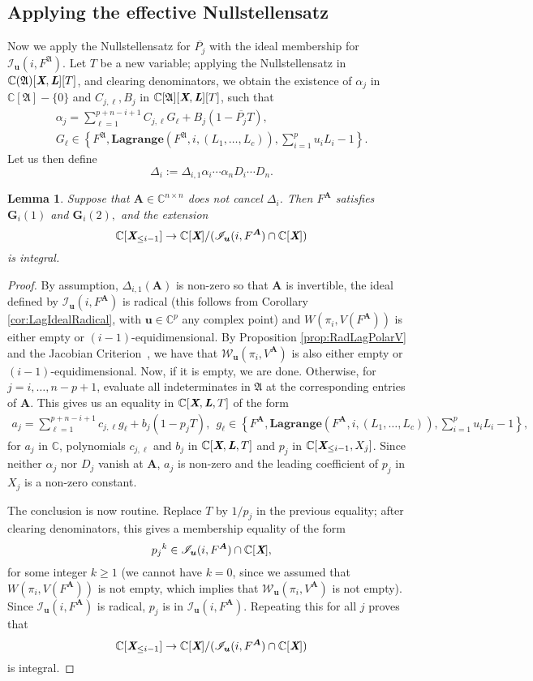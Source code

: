 \documentclass[a4paper]{article}
\def\A{\mathfrak{A}}
\def\Lb{\textit{\textbf{L}}}
\def\Xb{\textit{\textbf{X}}}
\def\mA{{\bm A}}
\def\ub{{\bm u}}
\def\pjb{\overline{P_{j}}}
\def\D{\Delta}
\def\C{\mathbb{C}}
\def\WiA{W(\pi_i,V(F^{\mA}))}
\def\lagFA{{\bm{Lagrange}}(F^{\mA},i,(L_1,\hdots,L_c))}
\def\lagFfA{{\bm{Lagrange}}(F^{\A},i,(L_1,\hdots,L_c))}
\def\IilA{\mathscr{I}_{\ub}(i,F^{\mA})}
\def\IilfA{\mathscr{I}_{\ub}(i,F^{\A})}
\def\WilA{\mathscr{W}_{\ub}(\pi_i,V^{\mA})}
\def\udl{\sum_{i=1}^pu_iL_i}
\newtheorem{lemma}[theorem]{Lemma}
\begin{document}
\subsection{Applying the effective Nullstellensatz}
Now we apply the Nullstellensatz for $\pjb$ with the ideal membership for $\IilfA.$ Let $T$ be a new variable; applying the
Nullstellensatz in $\C(\A)[\Xb,\Lb][T]$, and clearing
denominators, we obtain the existence of $\alpha_j$ in
$\C[\A]-\{0\}$ and $ C_{j,\ell},B_j$ in
$\C[\A][\Xb,\Lb][T]$, such that
\begin{align*}
\alpha_j = \sum_{\ell=1}^{p+n-i+1} C_{j,\ell} G_\ell + B_j (1-\pjb T),\\  G_\ell \in 
\left\{ 
F^\A,\lagFfA, \udl-1
\right\}.
\end{align*}
Let us then define 
$$\D_{i}:=\D_{i,1} \alpha_i \cdots \alpha_n D_i \cdots D_n.$$

\begin{lemma}\label{lem:6.4}
Suppose that $\mA \in \C^{n\times n}$ does not cancel $\D_{i}$. Then $F^{\mA}$ satisfies $\bm G_i(1)$ and $\bm G_i(2),$ and the extension
\[
 \C[\Xb_{\leq i-1}]\rightarrow \C[\Xb]/(\IilA \cap \C[\Xb])
\]
is integral.
\end{lemma}

\begin{proof}
By assumption, $\D_{i,1}(\mA)$ is non-zero so that $\mA$ is
invertible, the
ideal defined by $\IilA$ is radical (this follows from Corollary \ref{cor:LagIdealRadical}, with $\ub \in \C^p$ any complex point) and 
$\WiA$ is either empty or $(i-1)$-equidimensional. By Proposition \ref{prop:RadLagPolarV} and the Jacobian Criterion~\cite[Corollary 16.20]{ECA}, we have that $\WilA$ is also either empty or $(i-1)$-equidimensional. Now, if
it is empty, we are done. Otherwise, for $j=i,\dots,n-p+1$, evaluate all indeterminates in $\A$ at the
corresponding entries of $\mA$. This gives us
an equality in $\C[\Xb,\Lb,T]$ of the form
\begin{align*}
a_j = \sum_{\ell=1}^{p+n-i+1} c_{j,\ell} g_\ell + b_j (1-p_j T),\ \  g_\ell \in 
\left\{ 
F^{\mA}, \lagFA, \udl-1
\right\},
\end{align*}
for $a_j$ in $\C$, polynomials $c_{j,\ell}$ and $b_j$ in
$\C[\Xb,\Lb,T]$ and $p_j$ in
$\C[\Xb_{\leq i-1},X_j]$. Since neither $\alpha_j$ nor $D_j$
vanish at $\mA$, $a_j$ is non-zero and the leading coefficient of
$p_j$ in $X_j$ is a non-zero constant.

The conclusion is now routine. Replace $T$ by $1/p_j$ in the
previous equality; after clearing denominators, this gives a
membership equality of the form 
\[
p_j{}^k \in \IilA \cap \C[\Xb],
\]
for some integer $k \ge 1$ (we cannot have $k=0$, since we assumed that $\WiA$ is not empty, which implies that $\WilA$ is not empty). Since $\IilA$ is radical,
$p_j$ is in $\IilA$. Repeating this for all $j$ proves that 
\[
\C[\Xb_{\leq i-1}]\rightarrow\C[\Xb]/(\IilA \cap \C[\Xb])
\]
is integral.
\end{proof}
\end{document}
